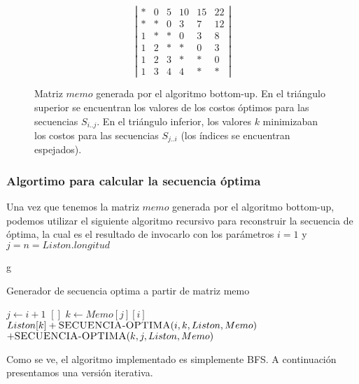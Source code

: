 \begin{figure}

\[ \left| \begin{array}{cccccc}
* & 0 & 5 & 10 & 15 & 22 \\
* & * & 0 & 3  & 7 & 12 \\
1 & * & * & 0  & 3 & 8 \\
1 & 2 & * & *  & 0 & 3 \\
1 & 2 & 3 & *  & * & 0 \\
1 & 3 & 4 & 4  & * & * \end{array} \right|\]

  \caption{Matriz $memo$ generada por el algoritmo bottom-up. En el tri\'angulo superior se encuentran los valores de los costos \'optimos para las secuencias $S_{i..j}$. En el tri\'angulo inferior, los valores $k$ minimizaban los costos para las secuencias $S_{j..i}$ (los \'indices se encuentran espejados).  }
\end{figure}
	
\subsubsection{Algortimo para calcular la secuencia \'optima}
Una vez que tenemos la matriz $memo$ generada por el algoritmo bottom-up, podemos utilizar el siguiente algoritmo recursivo para reconstruir la secuencia de \'optima, la cual es el resultado de invocarlo con los par\'ametros $i = 1$ y $j=n=Liston.longitud$ 


\begin{algorithm}[H]
g\caption{Generador de secuencia optima a partir de matriz memo} 
	\begin{codebox}
		\li \If $j \gets i + 1$
		\li 	\Then	
						\Return $[]$
		\li \Else 
		\li		$k \gets Memo[j][i]$	
		\li		\Return $Liston[k] + \textnormal{\scshape SECUENCIA-OPTIMA}(i, k, Liston, Memo) $ \\ \>\>\>\>\>$+ \textnormal{\scshape SECUENCIA-OPTIMA}(k, j, Liston, Memo)$
		\End
		\End
	\end{codebox}
\end{algorithm}

Como se ve, el algoritmo implementado es simplemente BFS. A continuaci\'on presentamos una versi\'on iterativa.


